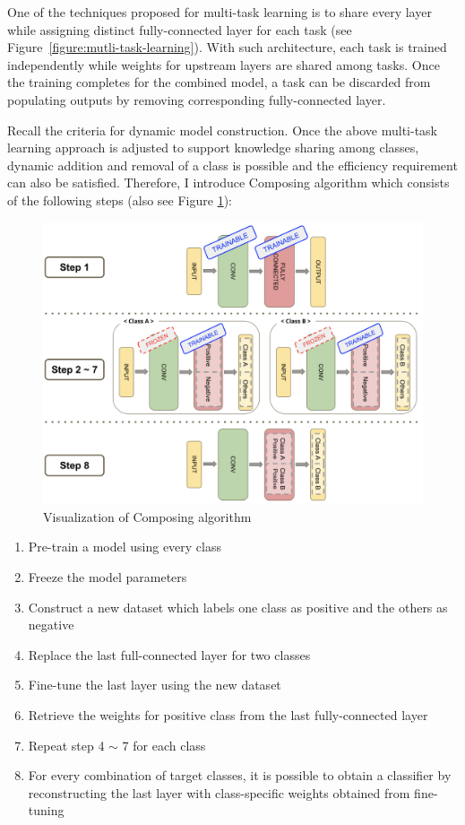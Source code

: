 \documentclass{article}
\begin{document}
One of the techniques proposed for multi-task learning is to share every layer while assigning distinct fully-connected layer for each task (see Figure~\ref{figure:mutli-task-learning}). With such architecture, each task is trained independently while weights for upstream layers are shared among tasks. Once the training completes for the combined model, a task can be discarded from populating outputs by removing corresponding fully-connected layer.

Recall the criteria for dynamic model construction. Once the above multi-task learning approach is adjusted to support knowledge sharing among classes, dynamic addition and removal of a class is possible and the efficiency requirement can also be satisfied. Therefore, I introduce Composing algorithm which consists of the following steps (also see Figure \ref{figure:composing_algo}):

\begin{figure}[t]
    \centering
    \includegraphics[scale=0.3,trim={0mm 0mm 0mm 0mm},clip]{composing_algo.png}
    \caption{Visualization of Composing algorithm}
    \label{figure:composing_algo}
\end{figure}


\begin{enumerate}
    \item Pre-train a model using every class
    \item Freeze the model parameters
    \item Construct a new dataset which labels one class as positive and the others as negative
    \item Replace the last full-connected layer for two classes
    \item Fine-tune the last layer using the new dataset
    \item Retrieve the weights for positive class from the last fully-connected layer
    \item Repeat step 4 $\sim$ 7 for each class
    \item For every combination of target classes, it is possible to obtain a classifier by reconstructing the last layer with class-specific weights obtained from fine-tuning
\end{enumerate}
\end{document}
